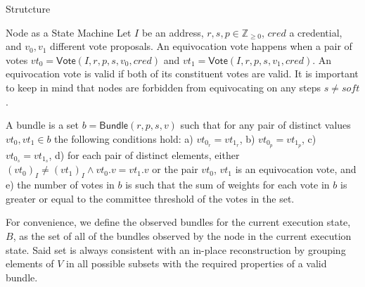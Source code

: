 \documentclass[10pt,a4paper]{article}
\begin{document}
\begin{section}{Strutcture}
\begin{subsection}{Node as a State Machine}
Let $I$ be an address, $r, s, p\in\mathbb{Z}_{\ge 0}$, $cred$ a credential, and $v_0,v_1$ different
vote proposals.
An {\sf equivocation vote} happens when a pair of votes
$vt_0 = \mathsf{Vote}(I, r, p, s, v_0, cred)$ and $vt_1 = \mathsf{Vote}(I, r, p, s, v_1, cred)$.
An equivocation vote is valid if both of its constituent votes are valid.
It is important to keep in mind that nodes are forbidden from equivocating 
on any steps $s \neq soft$.

A {\sf bundle} is a set $b = \mathsf{Bundle}(r,p,s,v)$ such that for any pair of distinct values 
$vt_0, vt_1 \in b$ the following conditions hold: 
a) $vt_{0_r} = vt_{1_r} $, 
b) $vt_{0_p} = vt_{1_p}$,
c) $vt_{0_s} = vt_{1_s}$,
d) for each pair of distinct elements, either $(vt_0)_I \neq (vt_1)_I \land vt_0.v = vt_1.v$ or the pair $vt_0$, $vt_1$ 
is an equivocation vote, and
e) the number of votes in $b$ is such that the sum of weights for each vote in $b$ is greater or equal to the
committee threshold of the votes in the set.

For convenience, we define the {\sf observed bundles} for the current execution state, $B$, 
as the set of all of the bundles
observed by the node in the current execution state. Said set is always consistent with an in-place
reconstruction by grouping elements of $V$ in all possible subsets with the required properties
of a valid bundle.
\end{subsection}

\end{section}
\end{document}
